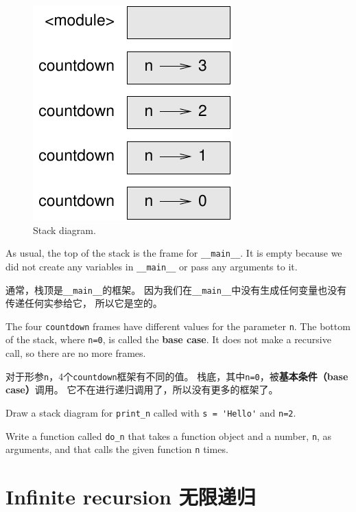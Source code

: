 \documentclass[10pt]{book}
\begin{document}
\begin{CJK}{UTF8}{gbsn}
\begin{figure}
\centerline
{\includegraphics[scale=0.8]{figs/stack2.pdf}}
\caption{Stack diagram.}
\label{fig.stack2}
\end{figure}


As usual, the top of the stack is the frame for \verb"__main__".
It is empty because we did not create any variables in 
\verb"__main__" or pass any arguments to it.

通常，栈顶是\verb"__main__"的框架。
因为我们在\verb"__main__"中没有生成任何变量也没有传递任何实参给它，
所以它是空的。

The four {\tt countdown} frames have different values for the
parameter {\tt n}.  The bottom of the stack, where {\tt n=0}, is
called the {\bf base case}.  It does not make a recursive call, so
there are no more frames.

对于形参{\tt n}，4个{\tt countdown}框架有不同的值。
栈底，其中{\tt n=0}，被{\bf 基本条件（base case）}调用。
它不在进行递归调用了，所以没有更多的框架了。

\begin{exercise}
Draw a stack diagram for \verb"print_n" called with
\verb"s = 'Hello'" and {\tt n=2}.
\end{exercise}

\begin{exercise}
Write a function called \verb"do_n" that takes a function
object and a number, {\tt n}, as arguments, and that calls
the given function {\tt n} times.
\end{exercise}



\section{Infinite recursion 无限递归}


\end{CJK}
\end{document}
